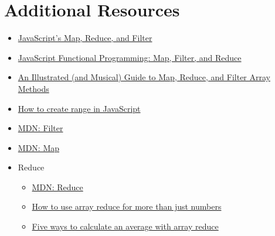 \pagebreak

\section{Additional Resources}

\begin{itemize}[leftmargin=*]
    \item \href{https://danmartensen.svbtle.com/javascripts-map-reduce-and-filter}{JavaScript's Map, Reduce, and Filter}
    \item \href{https://medium.com/jsguru/javascript-functional-programming-map-filter-and-reduce-846ff9ba492d}{JavaScript Functional Programming: Map, Filter, and Reduce}
    \item \href{https://css-tricks.com/an-illustrated-and-musical-guide-to-map-reduce-and-filter-array-methods/}{An Illustrated (and Musical) Guide to Map, Reduce, and Filter Array Methods}
    \item \href{https://dev.to/ycmjason/how-to-create-range-in-javascript-539i}{How to create range in JavaScript}
    \item \href{https://developer.mozilla.org/en-US/docs/Web/JavaScript/Reference/Global_Objects/Array/filter}{MDN: Filter}
    \item \href{https://developer.mozilla.org/en-US/docs/Web/JavaScript/Reference/Global_Objects/Array/map}{MDN: Map}
    \item Reduce
        \begin{itemize}
            \item \href{https://developer.mozilla.org/en-US/docs/Web/JavaScript/Reference/Global_Objects/Array/Reduce}{MDN: Reduce}
            \item \href{https://jrsinclair.com/articles/2019/functional-js-do-more-with-reduce/}{How to use array reduce for more than just numbers}
            \item \href{https://jrsinclair.com/articles/2019/five-ways-to-average-with-js-reduce/}{Five ways to calculate an average with array reduce}
        \end{itemize}
\end{itemize}
